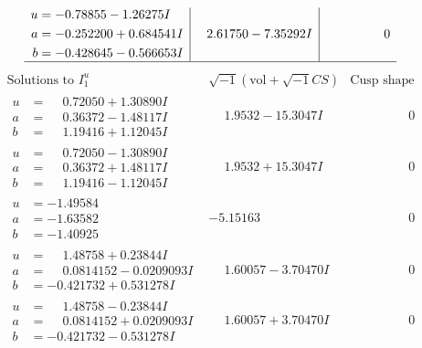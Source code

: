 \documentclass[1p]{elsarticle_modified}
\theoremstyle{definition}
\newcommand{\I}{\sqrt{-1}}
\begin{document}
$$\begin{array}{c|c|c}
\begin{aligned}
u &= -0.78855 - 1.26275 I \\
a &= -0.252200 + 0.684541 I \\
b &= -0.428645 - 0.566653 I\end{aligned}
 & \phantom{-}2.61750 - 7.35292 I & \phantom{-0.000000 } 0\\
 \hline 
 \end{array}$$\newpage$$\begin{array}{c|c|c}  
\text{Solutions to }I^u_{1}& \I (\text{vol} + \sqrt{-1}CS) & \text{Cusp shape}\\
 \hline 
\begin{aligned}
u &= \phantom{-}0.72050 + 1.30890 I \\
a &= \phantom{-}0.36372 - 1.48117 I \\
b &= \phantom{-}1.19416 + 1.12045 I\end{aligned}
 & \phantom{-}1.9532 - 15.3047 I & \phantom{-0.000000 } 0 \\ \hline\begin{aligned}
u &= \phantom{-}0.72050 - 1.30890 I \\
a &= \phantom{-}0.36372 + 1.48117 I \\
b &= \phantom{-}1.19416 - 1.12045 I\end{aligned}
 & \phantom{-}1.9532 + 15.3047 I & \phantom{-0.000000 } 0 \\ \hline\begin{aligned}
u &= -1.49584\phantom{ +0.000000I} \\
a &= -1.63582\phantom{ +0.000000I} \\
b &= -1.40925\phantom{ +0.000000I}\end{aligned}
 & -5.15163\phantom{ +0.000000I} & \phantom{-0.000000 } 0 \\ \hline\begin{aligned}
u &= \phantom{-}1.48758 + 0.23844 I \\
a &= \phantom{-}0.0814152 - 0.0209093 I \\
b &= -0.421732 + 0.531278 I\end{aligned}
 & \phantom{-}1.60057 - 3.70470 I & \phantom{-0.000000 } 0 \\ \hline\begin{aligned}
u &= \phantom{-}1.48758 - 0.23844 I \\
a &= \phantom{-}0.0814152 + 0.0209093 I \\
b &= -0.421732 - 0.531278 I\end{aligned}
 & \phantom{-}1.60057 + 3.70470 I & \phantom{-0.000000 } 0 \\ \hline\begin{aligned}

\end{aligned}
\end{array}$$
\end{document}
